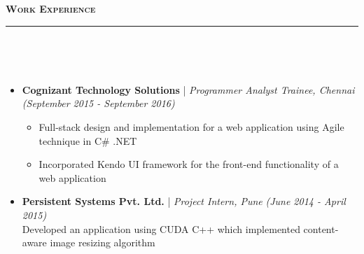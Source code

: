 \documentclass[a4paper,10pt]{article}
\newcommand{\isep}{-2 pt}
\newcommand{\lsep}{-0.5cm}
\newcommand{\resheading}[1]{{\small
        {
            \begin{minipage}
                {0.992\textwidth}\textbf{{\textsc{#1 \vphantom{p\^{E}} }}}
                \\[-0.3cm]
                \hrule
            \end{minipage}
            \\[-0.5cm]
        }
 }}
\begin{document}
 \vspace{0.05cm}
\resheading{\textbf{\large Work Experience}}\\[-0.4cm]
\begin{itemize}
    \item \textbf{Cognizant Technology Solutions} |
    \emph{Programmer Analyst Trainee, Chennai} \hfill {\emph{(September 2015 - September 2016)}}
    \\ [-0.6cm]
    \begin{itemize}\itemsep \isep
    \item Full-stack design and implementation for a web application using Agile technique in C\# .NET 
    \item Incorporated Kendo UI framework for the front-end functionality of a web application
 \\ [-0.6cm]
    \end{itemize}
    \item \textbf{Persistent Systems Pvt. Ltd.} |
    \emph{Project Intern, Pune} \hfill {\emph{(June 2014 - April 2015)}}
    \\ 
    Developed an application  using CUDA C++ which implemented content-aware image resizing algorithm \\[-0.5cm]
\end{itemize}
\end{document}
